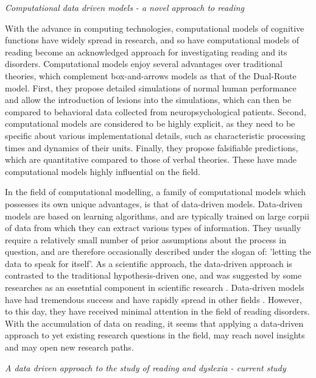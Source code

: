 \textit{Computational data driven models - a novel approach to reading}

With the advance in computing technologies, computational models of cognitive functions have widely spread in research, and so have computational models of reading become an acknowledged approach for investigating  reading and its disorders. Computational models enjoy several advantages over traditional theories, which complement box-and-arrows models as that of the Dual-Route model. First, they propose detailed simulations of normal human performance and allow the introduction of lesions into the simulations, which can then be compared to behavioral data collected from neuropsychological patients. Second, computational models are considered to be highly explicit, as they need to be specific about various implementational details, such as characteristic processing times and dynamics of their units. Finally, they propose falsifiable predictions, which are quantitative compared to those of verbal theories. These have  made computational models highly influential on the field.

In the field of computational modelling, a family of computational models which possesses its own unique advantages, is that of data-driven models. Data-driven models are based on learning algorithms, and are typically trained on large corpii of data from which they can extract various types of information. They usually require a relatively small number of prior assumptions about the process in question, and are therefore occasionally described under the slogan of: 'letting the data to speak for itself'. As a scientific approach, the data-driven approach is contrasted to the traditional hypothesis-driven one, and was suggested by some researches as an essetntial component in scientific research \citep{kell2004here}. Data-driven models have had tremendous success and have rapidly spread in other fields \citep{bell2009beyond, leonelli2014difference, lecun2015deep}. However, to this day, they have received minimal attention in the field of reading disorders. With the accumulation of data on reading, it seems that applying a data-driven approach to yet existing research questions in the field, may reach novel insights and may open new research paths.

\textit{A data driven approach to the study of reading and dyslexia - current study}

